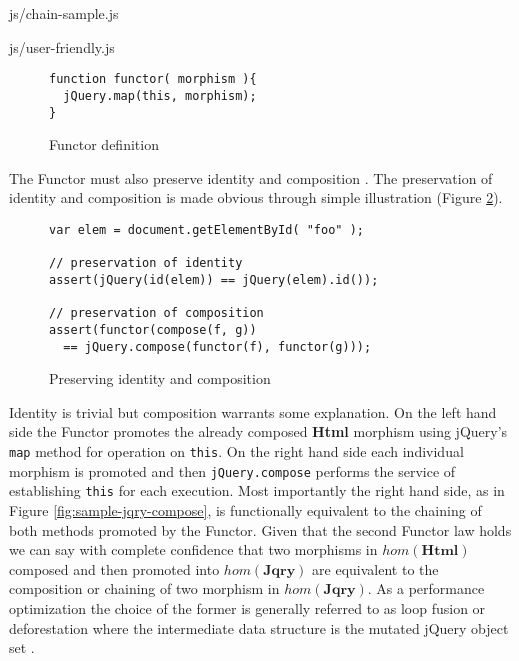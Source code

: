 \documentclass[preprint]{sigplanconf}
\begin{document}
\begin{lstinputlisting}[
    language=JavaScript,
    caption={Sources of Html objects},
    label={lst:chain-sample}
]{js/chain-sample.js}
\begin{lstinputlisting}[
    language=JavaScript,
    caption={User friendly overhead},
    label={lst:user-friendly}
]{js/user-friendly.js}
\begin{figure}[!ht]
\small
\begin{verbatim}
function functor( morphism ){
  jQuery.map(this, morphism);
}
\end{verbatim}
\nocaptionrule \caption{Functor definition}
\label{fig:functor-for-morphism}
\end{figure}

The Functor must also preserve identity and composition \cite[p. ~36]{bib:category-definition}. The preservation of identity and composition is made obvious through simple illustration (Figure \ref{fig:id-and-compose}).

\begin{figure}[!ht]
\small
\begin{verbatim}
var elem = document.getElementById( "foo" );

// preservation of identity
assert(jQuery(id(elem)) == jQuery(elem).id());

// preservation of composition
assert(functor(compose(f, g))
  == jQuery.compose(functor(f), functor(g)));
\end{verbatim}
\nocaptionrule \caption{Preserving identity and composition}
\label{fig:id-and-compose}
\end{figure}

Identity is trivial but composition warrants some explanation. On the left hand side the Functor promotes the already composed \textbf{Html} morphism using jQuery's \verb|map| method for operation on \verb|this|. On the right hand side each individual morphism is promoted and then \verb|jQuery.compose| performs the service of establishing \verb|this| for each execution. Most importantly the right hand side, as in Figure \ref{fig:sample-jqry-compose}, is functionally equivalent to the chaining of both methods promoted by the Functor. Given that the second Functor law holds we can say with complete confidence that two morphisms in \begin{math}hom(\mathbf{Html})\end{math} composed and then promoted into \begin{math}hom(\mathbf{Jqry})\end{math} are equivalent to the composition or chaining of two morphism in \begin{math}hom(\mathbf{Jqry})\end{math}. As a performance optimization the choice of the former is generally referred to as loop fusion or deforestation where the intermediate data structure is the mutated jQuery object set \cite{bib:deforestation}.


\end{lstinputlisting}
\end{lstinputlisting}
\end{document}
